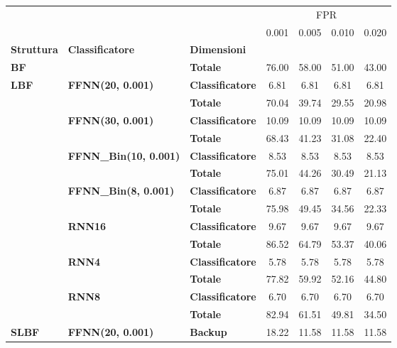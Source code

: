 \begin{table}[H]
\centering
\begin{tabular}{|l|l|l|c|c|c|c|}
\hline
     &      &        & \multicolumn{4}{|c|}{FPR} \\
     &      &        & 0.001 & 0.005 & 0.010 & 0.020 \\
\textbf{Struttura} & \textbf{Classificatore} & \textbf{Dimensioni} &       &       &       &       \\
\hline
\textbf{BF} &      & \textbf{Totale} & 76.00 & 58.00 & 51.00 & 43.00 \\
\multirow{14}{*}{\textbf{LBF}} & \multirow{2}{*}{\textbf{FFNN(20, 0.001)}} & \textbf{Classificatore} &  6.81 &  6.81 &  6.81 &  6.81 \\
     &      & \textbf{Totale} & 70.04 & 39.74 & 29.55 & 20.98 \\
\cline{2-7}
     & \multirow{2}{*}{\textbf{FFNN(30, 0.001)}} & \textbf{Classificatore} & 10.09 & 10.09 & 10.09 & 10.09 \\
     &      & \textbf{Totale} & 68.43 & 41.23 & 31.08 & 22.40 \\
\cline{2-7}
     & \multirow{2}{*}{\textbf{FFNN\_Bin(10, 0.001)}} & \textbf{Classificatore} &  8.53 &  8.53 &  8.53 &  8.53 \\
     &      & \textbf{Totale} & 75.01 & 44.26 & 30.49 & 21.13 \\
\cline{2-7}
     & \multirow{2}{*}{\textbf{FFNN\_Bin(8, 0.001)}} & \textbf{Classificatore} &  6.87 &  6.87 &  6.87 &  6.87 \\
     &      & \textbf{Totale} & 75.98 & 49.45 & 34.56 & 22.33 \\
\cline{2-7}
     & \multirow{2}{*}{\textbf{RNN16}} & \textbf{Classificatore} &  9.67 &  9.67 &  9.67 &  9.67 \\
     &      & \textbf{Totale} & 86.52 & 64.79 & 53.37 & 40.06 \\
\cline{2-7}
     & \multirow{2}{*}{\textbf{RNN4}} & \textbf{Classificatore} &  5.78 &  5.78 &  5.78 &  5.78 \\
     &      & \textbf{Totale} & 77.82 & 59.92 & 52.16 & 44.80 \\
\cline{2-7}
     & \multirow{2}{*}{\textbf{RNN8}} & \textbf{Classificatore} &  6.70 &  6.70 &  6.70 &  6.70 \\
     &      & \textbf{Totale} & 82.94 & 61.51 & 49.81 & 34.50 \\
\cline{1-7}
\cline{2-7}
\multirow{28}{*}{\textbf{SLBF}} & \multirow{4}{*}{\textbf{FFNN(20, 0.001)}} & \textbf{Backup} & 18.22 & 11.58 & 11.58 & 11.58 \\

\end{tabular}
\end{table}
